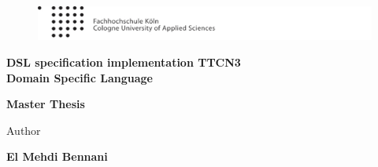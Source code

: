 
\begin{titlepage}

\begin{center}

\begin{figure}[!ht]
	\centering
		\includegraphics[natwidth=920pt, natheight=95pt, width=1.0\textwidth]{grafiken/logoheader.pdf}
\end{figure}

\vspace{0.8cm}

\begin{rmfamily}
\textbf{\huge DSL specification implementation TTCN3 \\ Domain Specific Language}\\
\normalsize
\end{rmfamily}
%
%

\vspace{1.2cm}



\begin{LARGE}
\textbf{Master Thesis}\\
\end{LARGE}


\vspace{0.4cm}

\begin{large}
Author\\ 
\vspace{0.2cm}
\begin{LARGE}
\textbf{El Mehdi Bennani}\\
\end{LARGE}
\end{large}


\end{center}
\end{titlepage}
